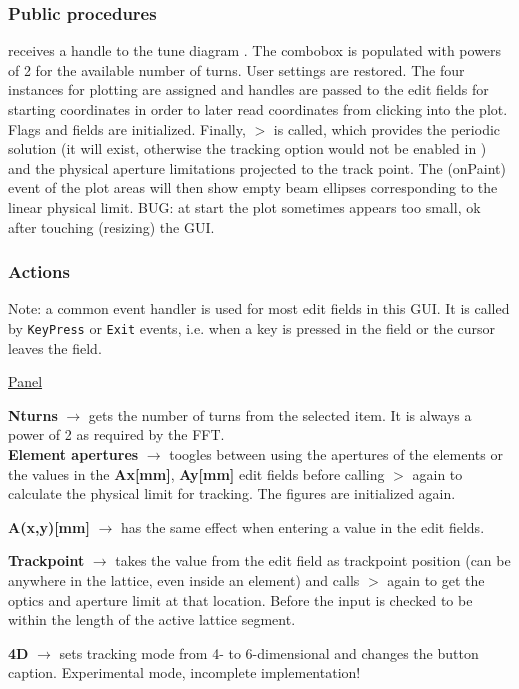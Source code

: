 \documentclass[12pt]{article}
\newcommand\code[1]{{\tt #1}}
\newcommand{\ofld}[1]{\colorbox{black!15}{{\bf #1}}}
\newcommand{\ofldx}[1]{\colorbox{black!15}{(#1)}}
\newcommand\guico[1]{{\color{blue}\code{#1}}}
\newcommand{\unico}[1]{{\color{burntorange}\code{#1}}}
\newcommand{\evcod}[2]{\ofld{#1} $\rightarrow$ \guico{#2}}
\newcommand{\prcod}[2]{\opauni{#1}$>$\unico{#2}}
\newcommand{\opagui}[1]{\colorbox{blue!20}{{\color{black}\code{#1}}}}
\newcommand{\ogui}[1]{\hyperref[#1]{\opagui{#1}}}
\newcommand{\opaguif}[1]{\colorbox{violet!30}{{\color{black}\code{#1}}}}
\newcommand{\oguif}[1]{\hyperref[#1]{\opaguif{#1}}}
\newcommand{\opauni}[1]{\colorbox{orange!30}{{\color{black}\code{#1}}}}
\newcommand{\act}[1]{\subsubsection*{Actions} #1}
\newcommand{\ppro}[1]{\subsubsection*{Public procedures} #1}
\newcommand{\todo}[1]{{\color{red} #1}}
\begin{document}
\ppro{
\guico{Start} receives a handle to the tune diagram \ogui{opatunediag}. The combobox \guico{comTurns} is populated with powers of 2 for the available number of turns. User settings are restored. The four \oguif{../com/asfigure} instances for plotting are assigned and handles are passed to the edit fields for starting coordinates in order to later read coordinates from clicking into the plot. Flags and fields are initialized. Finally, \prcod{tracklib}{Initdpp} is called, which provides the periodic solution (it will exist, otherwise the tracking option would not be enabled in \ogui{opamenu}) and the physical aperture limitations projected to the track point. The \ofldx{onPaint} event of the plot areas will then show empty beam ellipses corresponding to the linear physical limit. \todo{BUG: at start the plot sometimes appears too small, ok after touching (resizing) the GUI.}
}

\act{}

Note: a common event handler \guico{ediAction} is used for most edit fields in this GUI. It is called by \code{KeyPress} or \code{Exit} events, i.e. when a key is pressed in the field or the cursor leaves the field.


\underline{Panel \guico{PanParam}}

\evcod{Nturns}{comTurnsChange} gets the number of turns from the selected item. It is always a power of 2 as required by the FFT.\\[1ex]

\evcod{Element apertures}{cbxElAperClick} toogles between using the apertures of the elements or the values in the \ofld{Ax[mm]}, \ofld{Ay[mm]} edit fields before calling \prcod{tracklib}{Initdpp} again to calculate the physical limit for tracking. The \guico{psx,psy} figures are initialized again.

\evcod{A(x,y)[mm]}{ediAction[edi(x,y)aper]} has the same effect when entering a value in the edit fields. 

\evcod{Trackpoint}{ediAction[edistartpos]} takes the value from the edit field as trackpoint position (can be anywhere in the lattice, even inside an element) and calls \prcod{tracklib}{Initdpp} again to get the optics and aperture limit at that location. Before the input is checked to be within the length of the active lattice segment.

\evcod{4D}{butT6Click} sets tracking mode from 4- to 6-dimensional and changes the button caption. \todo{Experimental mode, incomplete implementation!}\\[1ex]
\end{document}
